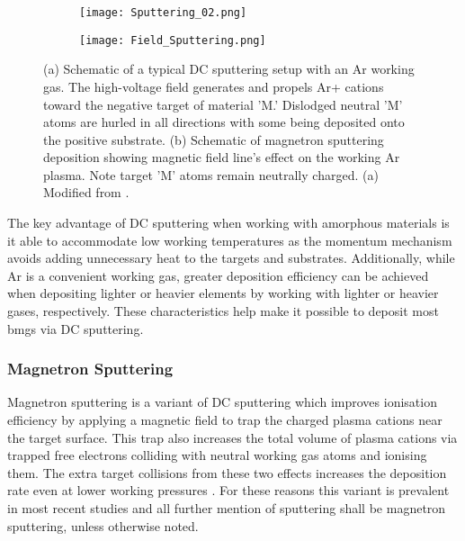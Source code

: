 \documentclass[a4paper,12pt,oneside]{report}%
\begin{document}
\begin{figure}[bp]
	\centering
	\begin{subfigure}[htbp]{0.75\textwidth}
		\texttt{[image: Sputtering\_02.png]}
		\caption{}
		\label{fig:Sputter_Schematic}
	\end{subfigure}
	\begin{subfigure}[htbp]{0.75\textwidth}
		\texttt{[image: Field\_Sputtering.png]}
		\caption{}
		\label{fig:Field_Sputtering}
	\end{subfigure}
	\caption[(a) Schematic of a typical DC sputtering setup with an Ar working gas. The high-voltage field generates and propels Ar+ cations toward the negative target of material 'M.' Dislodged neutral 'M' atoms are hurled in all directions with some being deposited onto the positive substrate. (b) Schematic of magnetron sputtering deposition showing magnetic field line's effect on the working Ar plasma. Note target 'M' atoms remain neutrally charged.]{(a) Schematic of a typical DC sputtering setup with an Ar working gas. The high-voltage field generates and propels Ar+ cations toward the negative target of material 'M.' Dislodged neutral 'M' atoms are hurled in all directions with some being deposited onto the positive substrate. (b) Schematic of magnetron sputtering deposition showing magnetic field line's effect on the working Ar plasma. Note target 'M' atoms remain neutrally charged. (a) Modified from \cite{Brown2014}.}%
	\label{fig:Sputter}
\end{figure}

The key advantage of DC sputtering when working with amorphous materials is it able to accommodate low working temperatures as the momentum mechanism avoids adding unnecessary heat to the targets and substrates. Additionally, while Ar is a convenient working gas, greater deposition efficiency can be achieved when depositing lighter or heavier elements by working with lighter or heavier gases, respectively. These characteristics help make it possible to deposit most \glspl{bmg} via DC sputtering. 

\subsubsection{Magnetron Sputtering}
Magnetron sputtering is a variant of DC sputtering which improves ionisation efficiency by applying a magnetic field to trap the charged plasma cations near the target surface. This trap also increases the total volume of plasma cations via trapped free electrons colliding with neutral working gas atoms and ionising them. The extra target collisions from these two effects increases the deposition rate even at lower working pressures . For these reasons this variant is prevalent in most recent studies and all further mention of sputtering shall be magnetron sputtering, unless otherwise noted. 
\end{document}
